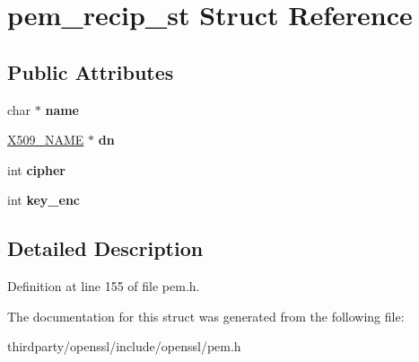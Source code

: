 \hypertarget{structpem__recip__st}{}\section{pem\+\_\+recip\+\_\+st Struct Reference}
\label{structpem__recip__st}
\subsection*{Public Attributes}
\begin{DoxyCompactItemize}
\item 
\mbox{\label{structpem__recip__st_a01cd4e55a392b7bc9c91f543800a7347}} 
char $\ast$ {\bfseries name}
\item 
\mbox{\label{structpem__recip__st_a7087e450cc6060c055c430535b0df70e}} 
\hyperlink{struct_x509__name__st}{X509\+\_\+\+N\+A\+ME} $\ast$ {\bfseries dn}
\item 
\mbox{\label{structpem__recip__st_aacc99505c76644287f2b94c986349f16}} 
int {\bfseries cipher}
\item 
\mbox{\label{structpem__recip__st_a10d41030c038defd986f740d1663b831}} 
int {\bfseries key\+\_\+enc}
\end{DoxyCompactItemize}


\subsection{Detailed Description}


Definition at line 155 of file pem.\+h.



The documentation for this struct was generated from the following file\+:\begin{DoxyCompactItemize}
\item 
thirdparty/openssl/include/openssl/pem.\+h\end{DoxyCompactItemize}
